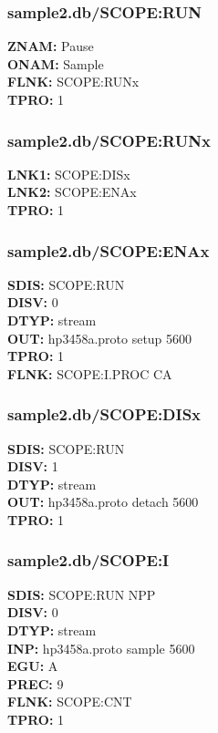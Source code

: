 \documentclass[12pt]{article}
\begin{document}
\subsubsection{sample2.db/SCOPE:RUN}
\textbf{ZNAM: }Pause \\
\textbf{ONAM: }Sample \\
\textbf{FLNK: }SCOPE:RUNx \\
\textbf{TPRO: }1 \\
\newpage
\subsubsection{sample2.db/SCOPE:RUNx}
\textbf{LNK1: }SCOPE:DISx \\
\textbf{LNK2: }SCOPE:ENAx \\
\textbf{TPRO: }1 \\
\newpage
\subsubsection{sample2.db/SCOPE:ENAx}
\textbf{SDIS: }SCOPE:RUN \\
\textbf{DISV: }0 \\
\textbf{DTYP: }stream \\
\textbf{OUT: }hp3458a.proto setup 5600 \\
\textbf{TPRO: }1 \\
\textbf{FLNK: }SCOPE:I.PROC CA \\
\newpage
\subsubsection{sample2.db/SCOPE:DISx}
\textbf{SDIS: }SCOPE:RUN \\
\textbf{DISV: }1 \\
\textbf{DTYP: }stream \\
\textbf{OUT: }hp3458a.proto detach 5600 \\
\textbf{TPRO: }1 \\
\newpage
\subsubsection{sample2.db/SCOPE:I}
\textbf{SDIS: }SCOPE:RUN NPP \\
\textbf{DISV: }0 \\
\textbf{DTYP: }stream \\
\textbf{INP: }hp3458a.proto sample 5600 \\
\textbf{EGU: }A \\
\textbf{PREC: }9 \\
\textbf{FLNK: }SCOPE:CNT \\
\textbf{TPRO: }1 \\
\newpage
\end{document}

